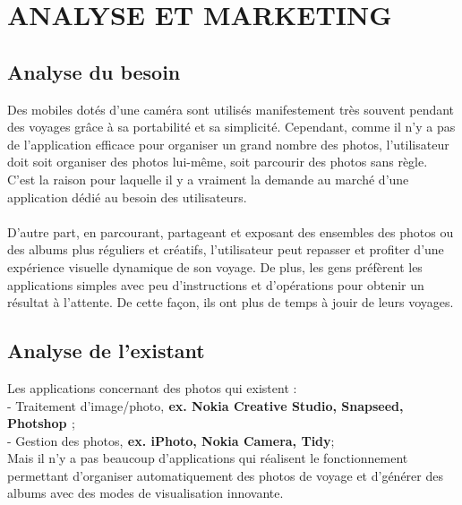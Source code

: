 \documentclass{article}
\begin{document}
\newpage
\section{\LARGE ANALYSE ET MARKETING }

\subsection{\Large  Analyse du besoin}
Des mobiles dotés d’une caméra sont utilisés manifestement très souvent pendant des voyages grâce à sa portabilité et sa simplicité. Cependant, comme il n’y a pas de l’application efficace pour organiser un grand nombre des photos, l’utilisateur doit soit  organiser des photos lui-même, soit parcourir des photos sans règle. C’est la raison pour laquelle il y a vraiment la demande au marché d’une application dédié au besoin des utilisateurs.\\\\
D’autre part, en parcourant, partageant et exposant des ensembles des photos ou des albums plus réguliers et créatifs, l’utilisateur peut repasser et profiter d’une expérience visuelle dynamique de son voyage. De plus, les gens préfèrent les applications simples avec peu d’instructions et d’opérations pour obtenir un résultat à l’attente. De cette façon, ils ont plus de temps à jouir de leurs voyages.

\subsection{\Large  Analyse de l'existant}

Les applications concernant des photos qui existent :\\
-	Traitement d’image/photo,{\bf { ex. Nokia Creative Studio, Snapseed, Photshop }};\\
-	Gestion des photos,{\bf { ex. iPhoto, Nokia Camera, Tidy}};\\
Mais il n’y a pas beaucoup d’applications qui réalisent le fonctionnement permettant d’organiser automatiquement des photos de voyage et d’générer des albums avec des modes de visualisation innovante.
\end{document}
